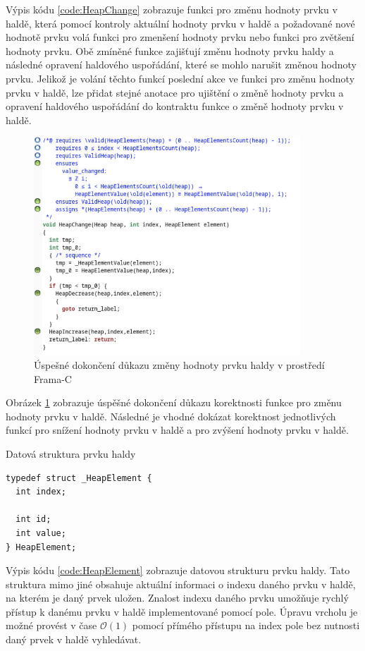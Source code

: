 Výpis kódu \ref{code:HeapChange} zobrazuje funkci pro změnu hodnoty prvku v haldě, která pomocí kontroly aktuální hodnoty prvku v haldě a požadované nové hodnotě prvku volá funkci pro zmenšení hodnoty prvku nebo funkci pro zvětšení hodnoty prvku. Obě zmíněné funkce zajišťují změnu hodnoty prvku haldy a následné opravení haldového uspořádání, které se mohlo narušit změnou hodnoty prvku. Jelikož je volání těchto funkcí poslední akce ve funkci pro změnu hodnoty prvku v haldě, lze přidat stejné anotace pro ujištění o změně hodnoty prvku a opravení haldového uspořádání do kontraktu funkce o změně hodnoty prvku v haldě.

\begin{figure}[H]
	\centering
	\includegraphics[width=10cm]{images/frama-c-HeapChange}
	\caption{Úspešné dokončení důkazu změny hodnoty prvku haldy v prostředí Frama-C}
	\label{img:F-C-HeapChange}
\end{figure}

Obrázek \ref{img:F-C-HeapChange} zobrazuje úspěšné dokončení důkazu korektnosti funkce pro změnu hodnoty prvku v haldě. Následné je vhodné dokázat korektnost jednotlivých funkcí pro snížení hodnoty prvku v haldě a pro zvýšení hodnoty prvku v haldě.

\begin{listing}[H]
	\caption{Datová struktura prvku haldy}
	\label{code:HeapElement}
	\begin{verbatim}
typedef struct _HeapElement {
  int index;

  int id;
  int value;
} HeapElement;
	\end{verbatim}
\end{listing}

Výpis kódu \ref{code:HeapElement} zobrazuje datovou strukturu prvku haldy. Tato struktura mimo jiné obsahuje aktuální informaci o indexu daného prvku v haldě, na kterém je daný prvek uložen. Znalost indexu daného prvku umožňuje rychlý přístup k danému prvku v haldě implementované pomocí pole. Úpravu vrcholu je možné provést v čase $\mathcal{O}(1)$ pomocí přímého přístupu na index pole bez nutnosti daný prvek v haldě vyhledávat. 


